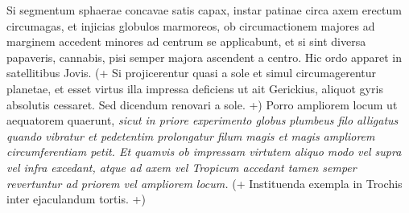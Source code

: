 Si segmentum sphaerae concavae satis capax,  instar patinae circa axem erectum circumagas, et injicias globulos marmoreos, ob  circumactionem majores ad marginem accedent minores ad centrum se applicabunt, et si  sint diversa  papaveris, cannabis, pisi semper majora  ascendent a centro. Hic ordo apparet in satellitibus Jovis\protect{}. (+ Si projicerentur quasi a sole\protect{} et simul  circumagerentur planetae, et esset virtus illa impressa  deficiens ut ait Gerickius\protect{}, aliquot gyris absolutis  cessaret. Sed dicendum renovari a sole\protect{}. +) Porro  ampliorem locum ut aequatorem\protect{} quaerunt, \textit{sicut  in priore experimento globus plumbeus filo alligatus  quando vibratur et pedetentim prolongatur filum  magis et magis ampliorem circumferentiam petit.  Et quamvis ob impressam virtutem aliquo modo  vel supra vel infra excedant, atque ad axem vel  Tropicum accedant tamen semper revertuntur ad  priorem vel ampliorem locum.} (+ Instituenda  exempla in Trochis inter ejaculandum tortis. +)
\pend 
